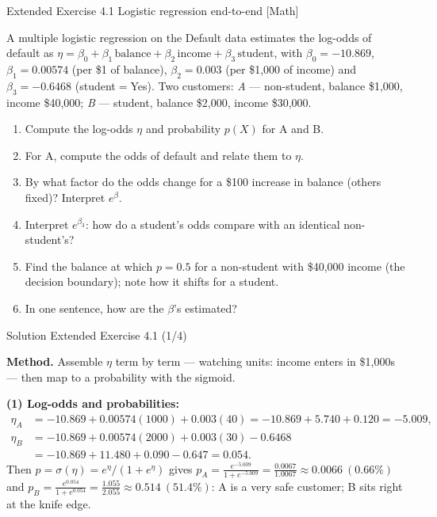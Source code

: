 \documentclass[aspectratio=169,11pt]{beamer}
\begin{document}
\begin{frame}{Extended Exercise 4.1 \textemdash{} Logistic regression end-to-end [Math]}
\begin{longexercise}
A multiple logistic regression on the Default data estimates the log-odds
of default as
$\eta=\beta_0+\beta_1\,\text{balance}+\beta_2\,\text{income}
      +\beta_3\,\text{student}$, with
$\beta_0=-10.869$, $\beta_1=0.00574$ (per \$1 of balance),
$\beta_2=0.003$ (per \$1{,}000 of income) and
$\beta_3=-0.6468$ (student${}={}$Yes). Two customers:
\emph{A} --- non-student, balance \$1{,}000, income \$40{,}000;\quad
\emph{B} --- student, balance \$2{,}000, income \$30{,}000.
\begin{enumerate}
  \item Compute the log-odds $\eta$ and probability $p(X)$ for A and B.
  \item For A, compute the odds of default and relate them to $\eta$.
  \item By what factor do the odds change for a \$100 increase in balance
        (others fixed)? Interpret $e^{\beta}$.
  \item Interpret $e^{\beta_3}$: how do a student's odds compare with an
        identical non-student's?
  \item Find the balance at which $p=0.5$ for a non-student with
        \$40{,}000 income (the decision boundary); note how it shifts for
        a student.
  \item In one sentence, how are the $\beta$'s estimated?
\end{enumerate}
\end{longexercise}
\end{frame}

\begin{frame}{Solution \textemdash{} Extended Exercise 4.1 (1/4)}
\begin{solutionbox}
\textbf{Method.} Assemble $\eta$ term by term --- watching units:
income enters in \$1{,}000s --- then map to a probability with the
sigmoid.

\vspace{1mm}
\textbf{(1) Log-odds and probabilities:}
\[
\begin{aligned}
  \eta_A&=-10.869+0.00574(1000)+0.003(40)
         =-10.869+5.740+0.120=-5.009,\\
  \eta_B&=-10.869+0.00574(2000)+0.003(30)-0.6468\\
        &=-10.869+11.480+0.090-0.647=0.054.
\end{aligned}
\]
Then $p=\sigma(\eta)=e^{\eta}/(1+e^{\eta})$ gives
$p_A=\tfrac{e^{-5.009}}{1+e^{-5.009}}=\tfrac{0.0067}{1.0067}
\approx 0.0066\ (0.66\%)$ and
$p_B=\tfrac{e^{0.054}}{1+e^{0.054}}=\tfrac{1.055}{2.055}
\approx 0.514\ (51.4\%)$: A is a very safe customer; B sits right at
the knife edge.
\end{solutionbox}
\end{frame}
\end{document}
